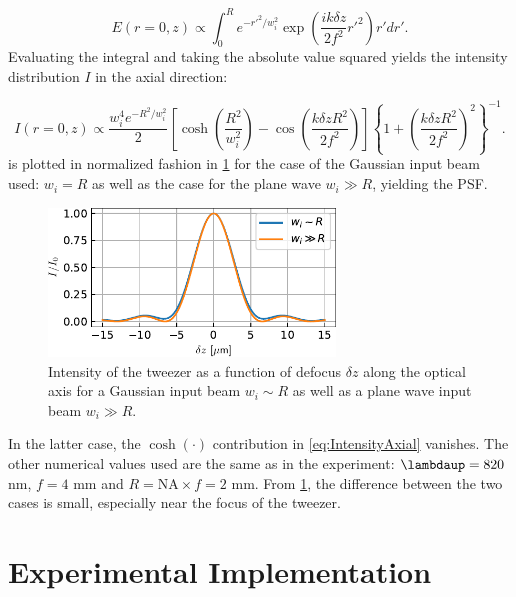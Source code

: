 \begin{equation}
	E(r=0,z) \propto \int_0^R e^{-r'^2/w_i^2} \exp{\left(
		\frac{i k \delta z}{2f^2}r'^2
		\right)} r'dr'.
\end{equation}
Evaluating the integral and taking the absolute value squared yields the intensity distribution $I$ in the axial direction:



\begin{equation}\label{eq:IntensityAxial}
	I(r=0,z) \propto \frac{w_i^4 e^{-R^2/w_i^2}}{2} \left[
	\cosh\left(\frac{R^2}{w_i^2}\right)-\cos\left(\frac{k \delta z R^2}{2f^2}\right)
	\right]
	\left\{
	1+\left(\frac{k\delta z R^2}{2 f^2}\right)^2
	\right\}^{-1}.
\end{equation}
 is plotted in normalized fashion in \cref{fig:PSFvsLongitudinal} for the case of the Gaussian input beam used: $w_i = R$ as well as the case for the plane wave $w_i \gg R$, yielding the \ac{PSF}.
\begin{figure}
	\centering
	\includegraphics[width=0.68\textwidth]{figures/LongitudinalTweezerField.pdf}
	\caption{Intensity of the tweezer as a function of defocus $\delta z$ along the optical axis for a Gaussian input beam $w_i \sim R$ as well as a plane wave input beam $w_i \gg R$.}
	\label{fig:PSFvsLongitudinal}
\end{figure}
In the latter case, the $\cosh(\cdot)$ contribution in \cref{eq:IntensityAxial} vanishes.
The other numerical values used are the same as in the experiment: $\lambdaup= 820$ nm, $f=4$ mm and $R = \text{NA} \times f = 2$ mm.
From \cref{fig:PSFvsLongitudinal}, the difference between the two cases is small, especially near the focus of the tweezer.





\section{Experimental Implementation}\label{sec:MeasuringTweezer}

